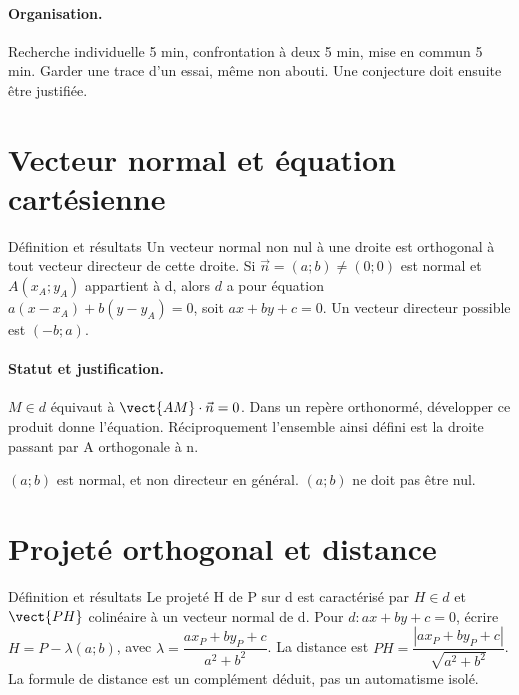 \paragraph{Organisation.} Recherche individuelle 5 min, confrontation à deux 5 min, mise en commun 5 min. Garder une trace d’un essai, même non abouti. Une conjecture doit ensuite être justifiée.
\section{Vecteur normal et équation cartésienne}\label{C07-U1}
\begin{repere}{Définition et résultats}
Un vecteur normal non nul à une droite est orthogonal à tout vecteur directeur de cette droite. Si $\vec n=(a;b)\ne(0;0)$ est normal et $A(x_A;y_A)$ appartient à d, alors $d$ a pour équation $a(x-x_A)+b(y-y_A)=0$, soit $ax+by+c=0$. Un vecteur directeur possible est $(-b;a)$.
\end{repere}
\paragraph{Statut et justification.} $M\in d$ équivaut à $\vect{AM}\cdot\vec n=0$. Dans un repère orthonormé, développer ce produit donne l’équation. Réciproquement l’ensemble ainsi défini est la droite passant par A orthogonale à n.
\label{C07-EX1}
\begin{erreur}$(a;b)$ est normal, et non directeur en général. $(a;b)$ ne doit pas être nul.\end{erreur}
\label{C07-AP1}
\section{Projeté orthogonal et distance}\label{C07-U2}
\begin{repere}{Définition et résultats}
Le projeté H de P sur d est caractérisé par $H\in d$ et $\vect{PH}$ colinéaire à un vecteur normal de d. Pour $d:ax+by+c=0$, écrire $H=P-\lambda(a;b)$, avec $\lambda =\dfrac{ax_P+by_P+c}{a^2+b^2}$. La distance est $PH=\dfrac{|ax_P+by_P+c|}{\sqrt {a^2+b^2}}$. La formule de distance est un complément déduit, pas un automatisme isolé.
\end{repere}
